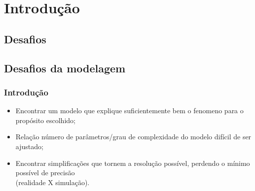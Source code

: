 \section{Introdução}


\subsection{Desafios}

\subsection{Desafios da modelagem}
\begin{frame}\frametitle{Introdução}
  \begin{itemize}
    \item Encontrar um modelo que explique suficientemente bem o fenomeno para o propósito escolhido;
    \item Relação número de parâmetros/grau de complexidade do modelo difícil de ser ajustado;
    \item Encontrar simplificações que tornem a resolução possível, perdendo o mínimo possível de precisão \\ (realidade X simulação). \\~\\
  \end{itemize}
\end{frame}

